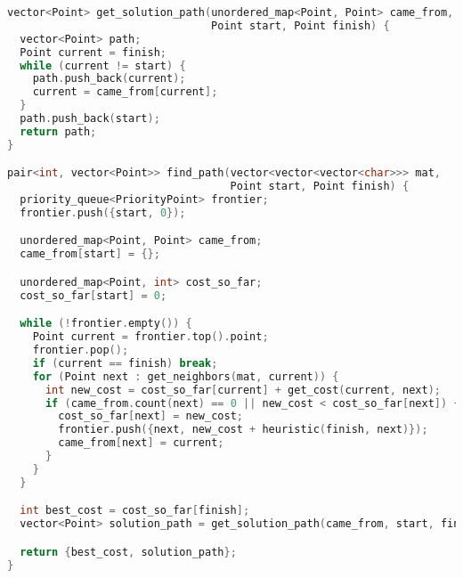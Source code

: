 \documentclass[a4paper,10pt,ngerman]{scrartcl}
\begin{document}
\begin{lstlisting}[language=C++]
vector<Point> get_solution_path(unordered_map<Point, Point> came_from,
                                Point start, Point finish) {
  vector<Point> path;
  Point current = finish;
  while (current != start) {
    path.push_back(current);
    current = came_from[current];
  }
  path.push_back(start);
  return path;
}

pair<int, vector<Point>> find_path(vector<vector<vector<char>>> mat,
                                   Point start, Point finish) {
  priority_queue<PriorityPoint> frontier;
  frontier.push({start, 0});

  unordered_map<Point, Point> came_from;
  came_from[start] = {};

  unordered_map<Point, int> cost_so_far;
  cost_so_far[start] = 0;

  while (!frontier.empty()) {
    Point current = frontier.top().point;
    frontier.pop();
    if (current == finish) break;
    for (Point next : get_neighbors(mat, current)) {
      int new_cost = cost_so_far[current] + get_cost(current, next);
      if (came_from.count(next) == 0 || new_cost < cost_so_far[next]) {
        cost_so_far[next] = new_cost;
        frontier.push({next, new_cost + heuristic(finish, next)});
        came_from[next] = current;
      }
    }
  }

  int best_cost = cost_so_far[finish];
  vector<Point> solution_path = get_solution_path(came_from, start, finish);

  return {best_cost, solution_path};
}
\end{lstlisting}
\end{document}
